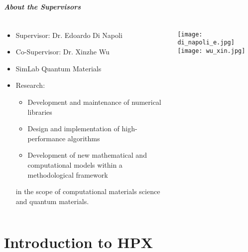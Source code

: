 \begin{frame}
\frametitle{About the Supervisors}
\begin{columns}[T]
 \begin{column}{.5\textwidth}
  \begin{itemize}
  \item Supervisor: Dr. Edoardo Di Napoli
  \item Co-Supervisor: Dr. Xinzhe Wu
  \item SimLab Quantum Materials
  \item Research:
    \begin{itemize}
    \item Development and maintenance of numerical libraries
    \item Design and implementation of high-performance algorithms
    \item Development of new mathematical and computational models within a methodological framework
    \end{itemize}
    in the scope of computational materials science and quantum materials.
  \end{itemize}
 \end{column}
 \begin{column}{.5\textwidth}
 \begin{center}
  \texttt{[image: di\_napoli\_e.jpg]}\texttt{[image: wu\_xin.jpg]}
 \end{center}
 \end{column}
\end{columns}
\end{frame}

\part{Introduction to HPX}
\makepart


